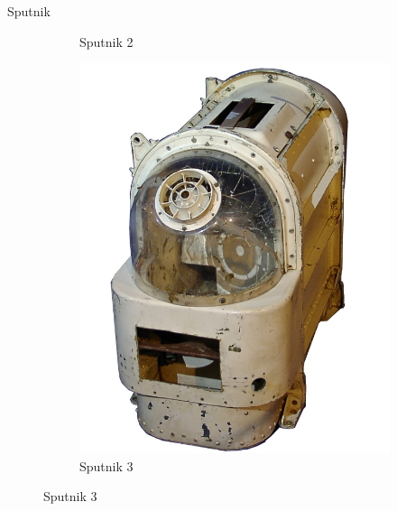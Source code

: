 \begin{frame}[fragile]{Sputnik}
\begin{figure}
\begin{subfigure}{0.33\textwidth}
			\caption{Sputnik 2}
		\end{subfigure}
		\pause
		\begin{subfigure}{0.32\textwidth}
			\centering
			\includegraphics[scale=0.4]{./EtapaPrimeriza/imagenes/s10.jpg}
			\caption{Sputnik 3}
		\end{subfigure}
	\end{figure}
\end{frame}

